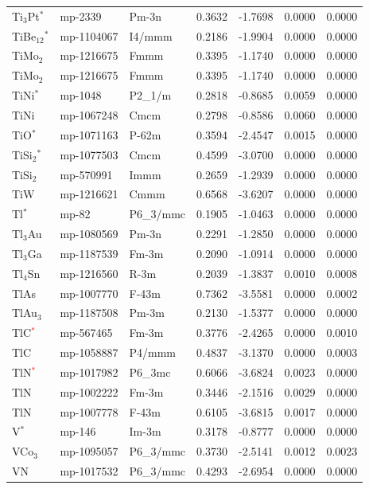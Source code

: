 \begin{longtable}{@{}lllrrrr@{}}
Ti$_{3}$Pt$^*$ & mp-2339 & Pm-3n & 0.3632 & -1.7698 & 0.0000 & 0.0000 \\
TiBe$_{12}$$^*$ & mp-1104067 & I4/mmm & 0.2186 & -1.9904 & 0.0000 & 0.0000 \\
TiMo$_{2}$ & mp-1216675 & Fmmm & 0.3395 & -1.1740 & 0.0000 & 0.0000 \\
TiMo$_{2}$ & mp-1216675 & Fmmm & 0.3395 & -1.1740 & 0.0000 & 0.0000 \\
TiNi$^*$ & mp-1048 & P2\_1/m & 0.2818 & -0.8685 & 0.0059 & 0.0000 \\
TiNi & mp-1067248 & Cmcm & 0.2798 & -0.8586 & 0.0060 & 0.0000 \\
TiO$^*$ & mp-1071163 & P-62m & 0.3594 & -2.4547 & 0.0015 & 0.0000 \\
TiSi$_{2}$$^*$ & mp-1077503 & Cmcm & 0.4599 & -3.0700 & 0.0000 & 0.0000 \\
TiSi$_{2}$ & mp-570991 & Immm & 0.2659 & -1.2939 & 0.0000 & 0.0000 \\
TiW & mp-1216621 & Cmmm & 0.6568 & -3.6207 & 0.0000 & 0.0000 \\
Tl$^*$ & mp-82 & P6\_3/mmc & 0.1905 & -1.0463 & 0.0000 & 0.0000 \\
Tl$_{3}$Au & mp-1080569 & Pm-3n & 0.2291 & -1.2850 & 0.0000 & 0.0000 \\
Tl$_{3}$Ga & mp-1187539 & Fm-3m & 0.2090 & -1.0914 & 0.0000 & 0.0000 \\
Tl$_{4}$Sn & mp-1216560 & R-3m & 0.2039 & -1.3837 & 0.0010 & 0.0008 \\
TlAs & mp-1007770 & F-43m & 0.7362 & -3.5581 & 0.0000 & 0.0002 \\
TlAu$_{3}$ & mp-1187508 & Pm-3m & 0.2130 & -1.5377 & 0.0000 & 0.0000 \\
TlC\textcolor{red}{$^*$} & mp-567465 & Fm-3m & 0.3776 & -2.4265 & 0.0000 & 0.0010 \\
TlC & mp-1058887 & P4/mmm & 0.4837 & -3.1370 & 0.0000 & 0.0003 \\
TlN\textcolor{red}{$^*$} & mp-1017982 & P6\_3mc & 0.6066 & -3.6824 & 0.0023 & 0.0000 \\
TlN & mp-1002222 & Fm-3m & 0.3446 & -2.1516 & 0.0029 & 0.0000 \\
TlN & mp-1007778 & F-43m & 0.6105 & -3.6815 & 0.0017 & 0.0000 \\
V$^*$ & mp-146 & Im-3m & 0.3178 & -0.8777 & 0.0000 & 0.0000 \\
VCo$_{3}$ & mp-1095057 & P6\_3/mmc & 0.3730 & -2.5141 & 0.0012 & 0.0023 \\
VN & mp-1017532 & P6\_3/mmc & 0.4293 & -2.6954 & 0.0000 & 0.0000 \\

\end{longtable}
